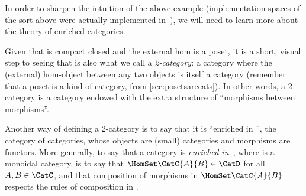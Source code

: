 In order to sharpen the intuition of the above example (implementation spaces of the sort above were actually implemented in~\cite{censi}), we will need to learn more about the theory of enriched categories.

Given that \DP is compact closed and the external hom is a poset, it is a short, visual step to seeing that \DP is also what we call a \emph{2-category}: a category where the (external) hom-object between any two objects is itself a category (remember that a poset is a kind of category, from \cref{sec:posetsarecats}).
In other words, a 2-category is a category endowed with the extra structure of ``morphisms between morphisms''.

Another way of defining a 2-category is to say that it is ``enriched in \Category'', the category of categories, whose objects are (small) categories and morphisms are functors.
More generally, to say that a category \CatC is \emph{enriched in~\CatD}, where \CatD is a monoidal category, is to say that $\HomSet\CatC{A}{B} \in \CatD$ for all $A,B \in \CatC$, and that composition of morphisms in $\HomSet\CatC{A}{B}$ respects the rules of composition in \CatD.

